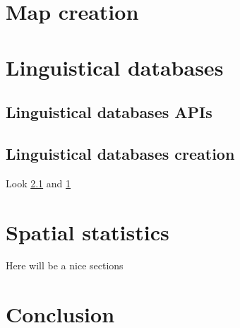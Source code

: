 \documentclass[]{book}
\theoremstyle{definition}
\theoremstyle{definition}
\theoremstyle{definition}
\theoremstyle{remark}
\begin{document}
\chapter{Map creation}\label{map-creation}

\chapter{Linguistical databases}\label{db}

\section{Linguistical databases APIs}\label{api}

\section{Linguistical databases creation}\label{db-creation}

Look \ref{api} and \ref{map-creation}

\chapter{Spatial statistics}\label{statistics}

Here will be a nice sections

\chapter{Conclusion}\label{conclusion}


\end{document}
